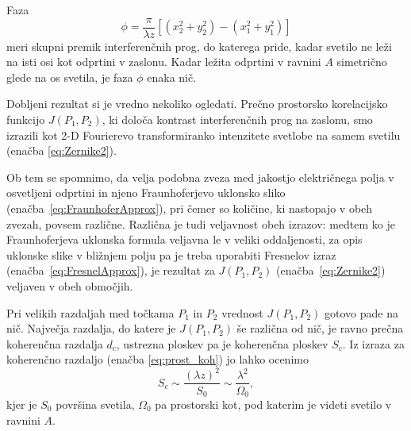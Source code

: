 Faza 
\begin{equation}
\phi=\frac{\pi}{\lambda z}[(x_{2}^{2}+y_{2}^{2})-(x_{1}^{2}+y_{1}^{2})]
\end{equation}
meri skupni premik interferenčnih prog, do katerega pride, kadar svetilo
ne leži na isti osi kot odprtini v zaslonu. Kadar ležita odprtini v ravnini $A$ 
simetrično glede na os svetila, je faza $\phi$ enaka nič.

Dobljeni rezultat si je vredno nekoliko ogledati. Prečno prostorsko
korelacijsko funkcijo $J(P_{1},P_{2})$, ki določa kontrast interferenčnih
prog na zaslonu, smo izrazili kot 2-D  Fourierevo transformiranko intenzitete svetlobe
na samem svetilu (enačba \ref{eq:Zernike2}). 
\begin{remark}
Ob tem se spomnimo,
da velja podobna zveza med jakostjo električnega polja v osvetljeni odprtini 
in njeno Fraunhoferjevo uklonsko sliko (enačba~\ref{eq:FraunhoferApprox}), 
pri čemer so količine, ki nastopajo v obeh zvezah,
povsem različne. Različna je tudi veljavnost obeh izrazov: medtem ko je Fraunhoferjeva
uklonska formula veljavna le v veliki oddaljenosti, za opis uklonske slike v bližnjem polju
pa je treba uporabiti Fresnelov izraz (enačba~\ref{eq:FresnelApprox}), 
je rezultat za $J(P_{1},P_{2})$ (enačba~\ref{eq:Zernike2}) veljaven v obeh območjih.
\end{remark}

Pri velikih razdaljah med točkama $P_{1}$ in $P_{2}$ vrednost $J(P_{1},P_{2})$ 
gotovo pade na nič. Največja razdalja, do katere je $J(P_{1},P_{2})$ še različna od nič, je ravno
prečna koherenčna razdalja $d_{c}$, ustrezna ploskev pa je koherenčna
ploskev $S_{c}$. Iz izraza za koherenčno razdaljo 
(enačba \ref{eq:prost_koh}) jo lahko ocenimo
\begin{equation}
S_{c}\sim\frac{(\lambda z)^{2}}{S_{0}}\sim\frac{\lambda^{2}}{\Omega_{0}},
\label{eq:koherencna-ploskev}
\end{equation}
kjer je $S_{0}$ površina svetila, $\Omega_{0}$ pa prostorski kot,
pod katerim je videti svetilo v ravnini $A$. 

